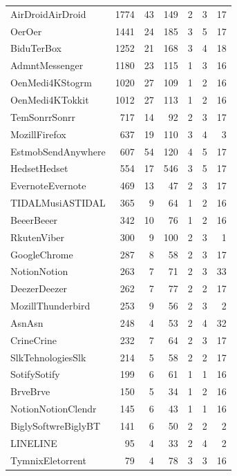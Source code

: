 \begin{longtable}{lrrrrrr}
AirDroidAirDroid         & 1774 & 43 & 149 & 2 & 3 & 17 \\
OerOer                 & 1441 & 24 & 185 & 3 & 5 & 17 \\
BiduTerBox             & 1252 & 21 & 168 & 3 & 4 & 18 \\
AdmntMessenger         & 1180 & 23 & 115 & 1 & 3 & 16 \\
OenMedi4KStogrm        & 1020 & 27 & 109 & 1 & 2 & 16 \\
OenMedi4KTokkit        & 1012 & 27 & 113 & 1 & 2 & 16 \\
TemSonrrSonrr          & 717  & 14 & 92  & 2 & 3 & 17 \\
MozillFirefox          & 637  & 19 & 110 & 3 & 4 & 3  \\
EstmobSendAnywhere     & 607  & 54 & 120 & 4 & 5 & 17 \\
HedsetHedset           & 554  & 17 & 546 & 3 & 5 & 17 \\
EvernoteEvernote       & 469  & 13 & 47  & 2 & 3 & 17 \\
TIDALMusiASTIDAL       & 365  & 9  & 64  & 1 & 2 & 16 \\
BeeerBeeer             & 342  & 10 & 76  & 1 & 2 & 16 \\
RkutenViber            & 300  & 9  & 100 & 2 & 3 & 1  \\
GoogleChrome           & 287  & 8  & 58  & 2 & 3 & 17 \\
NotionNotion           & 263  & 7  & 71  & 2 & 3 & 33 \\
DeezerDeezer           & 262  & 7  & 77  & 2 & 2 & 17 \\
MozillThunderbird      & 253  & 9  & 56  & 2 & 3 & 2  \\
AsnAsn                 & 248  & 4  & 53  & 2 & 4 & 32 \\
CrineCrine             & 232  & 7  & 64  & 2 & 3 & 17 \\
SlkTehnologiesSlk      & 214  & 5  & 58  & 2 & 2 & 17 \\
SotifySotify           & 199  & 6  & 61  & 1 & 1 & 16 \\
BrveBrve               & 150  & 5  & 34  & 1 & 2 & 16 \\
NotionNotionClendr     & 145  & 6  & 43  & 1 & 1 & 16 \\
BiglySoftwreBiglyBT    & 141  & 6  & 50  & 2 & 2 & 2  \\
LINELINE               & 95   & 4  & 33  & 2 & 4 & 2  \\
TymnixEletorrent       & 79   & 4  & 78  & 3 & 3 & 16 \\

\end{longtable}
